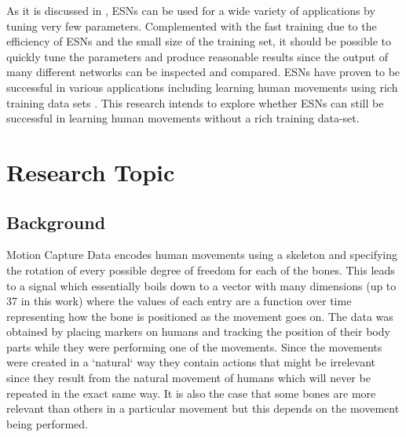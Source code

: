 \documentclass[letterpaper,9pt]{article}
\begin{document}
As it is discussed in \cite{ESNVerstraeten}, ESNs can be used for a wide variety of applications by tuning very few parameters. Complemented with the fast training due to the efficiency of ESNs \cite{Jaeger05TrainingRRN} and the small size of the training set, it should be possible to quickly tune the parameters and produce reasonable results since the output of many different networks can be inspected and compared. ESNs have proven to be successful in various applications including learning human movements using rich training data sets \cite{GentHumanMotion}. This research intends to explore whether ESNs can still be successful in learning human movements without a rich training data-set.



\section{Research Topic}

\subsection{Background}

Motion Capture Data encodes human movements using a skeleton and specifying the rotation of every possible degree of freedom for each of the bones. This leads to a signal which essentially boils down to a vector with many dimensions (up to 37 in this work) where the values of each entry are a function over time representing how the bone is positioned as the movement goes on. The data was obtained by placing markers on humans and tracking the position of their body parts while they were performing one of the movements. Since the movements were created in a `natural` way they contain actions that might be irrelevant since they result from the natural movement of humans which will never be repeated in the exact same way. It is also the case that some bones are more relevant than others in a particular movement but this depends on the movement being performed.\\
\end{document}
